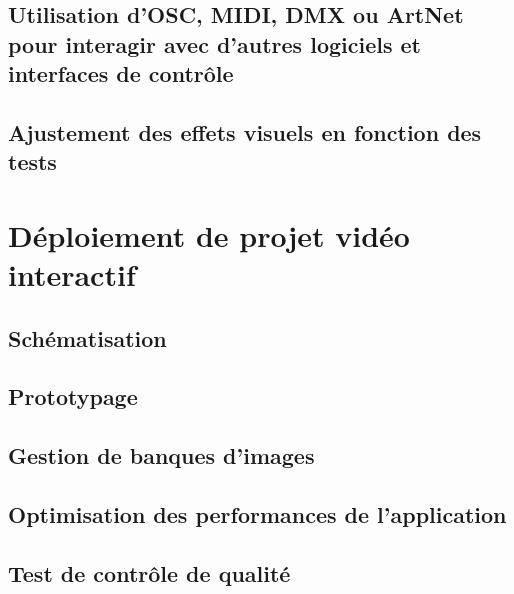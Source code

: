\documentclass[
]{book}
\begin{document}
\hypertarget{utilisation-dosc-midi-dmx-ou-artnet-pour-interagir-avec-dautres-logiciels-et-interfaces-de-contruxf4le}{%
\section{Utilisation d'OSC, MIDI, DMX ou ArtNet pour interagir avec d'autres logiciels et interfaces de contrôle}\label{utilisation-dosc-midi-dmx-ou-artnet-pour-interagir-avec-dautres-logiciels-et-interfaces-de-contruxf4le}}

\hypertarget{ajustement-des-effets-visuels-en-fonction-des-tests}{%
\section{Ajustement des effets visuels en fonction des tests}\label{ajustement-des-effets-visuels-en-fonction-des-tests}}

\hypertarget{duxe9ploiement-de-projet-viduxe9o-interactif}{%
\chapter{Déploiement de projet vidéo interactif}\label{duxe9ploiement-de-projet-viduxe9o-interactif}}

\hypertarget{schuxe9matisation}{%
\section{Schématisation}\label{schuxe9matisation}}

\hypertarget{prototypage}{%
\section{Prototypage}\label{prototypage}}

\hypertarget{gestion-de-banques-dimages}{%
\section{Gestion de banques d'images}\label{gestion-de-banques-dimages}}

\hypertarget{optimisation-des-performances-de-lapplication}{%
\section{Optimisation des performances de l'application}\label{optimisation-des-performances-de-lapplication}}

\hypertarget{test-de-contruxf4le-de-qualituxe9}{%
\section{Test de contrôle de qualité}\label{test-de-contruxf4le-de-qualituxe9}}
\end{document}
